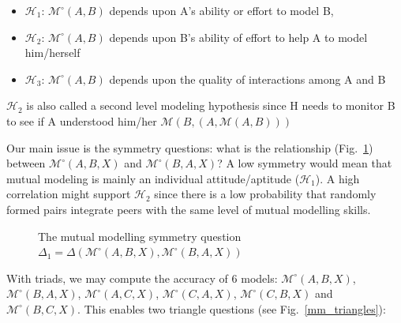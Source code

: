 \documentclass[twocolumn]{article}
\newcommand{\Model}[3]{{$\mathcal{M}^{\circ}(#1, #2, #3)$}}
\begin{document}
\begin{itemize}
    \item $\mathcal{H}_{1}$: $\mathcal{M}^{\circ}(A,B)$ depends upon A's ability or effort
        to model B,
    
    \item $\mathcal{H}_{2}$: $\mathcal{M}^{\circ}(A,B)$ depends upon  B's ability of
        effort to help A to model him/herself 

    \item $\mathcal{H}_{3}$: $\mathcal{M}^{\circ}(A,B)$ depends upon the quality of
        interactions among A and B

\end{itemize}



$\mathcal{H}_{2}$ is also called a second level modeling hypothesis since H
needs to monitor B to see if A understood him/her
$\mathcal{M}(B,(A,\mathcal{M}(A,B)))$

Our main issue is the symmetry questions: what is the relationship
(Fig.~\ref{mm_symmetry}) between \Model{A}{B}{X} and
\Model{B}{A}{X}? A low symmetry would mean that mutual modeling is
mainly an individual attitude/aptitude ($\mathcal{H}_{1}$). A high correlation
might support $\mathcal{H}_{2}$ since there is a low probability that randomly
formed pairs integrate peers with the same level of mutual modelling skills.

\begin{figure}[htb]
\centering


\caption{The mutual modelling symmetry question $\Delta_1 =  \Delta(\mathcal{M}^{\circ} (A,B,X),
\mathcal{M}^{\circ} (B,A,X))$}

\label{mm_symmetry}
\end{figure}


With triads, we may compute the accuracy of 6 models:
\Model{A}{B}{X}, \Model{B}{A}{X}, \Model{A}{C}{X}, \Model{C}{A}{X},
\Model{C}{B}{X} and \Model{B}{C}{X}. This enables two
triangle questions (see Fig.~\ref{mm_triangles}):
\end{document}
